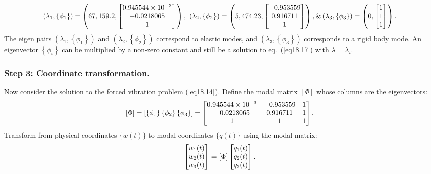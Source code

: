 \documentclass{AeroStructure-ERJohnson}
\begin{document}
\begin{align}\label{eq18.21}
\left(\lambda_{1},\left\{\phi_{1}\right\}\right)=\left(67,159.2,\left[\begin{array}{@{}c@{}}0.945544 \times 10^{-3} \\-0.0218065 \\1\end{array}\right]\right),\ \left(\lambda_{2},\left\{\phi_{2}\right\}\right)=\left(5,474.23,\left[\begin{array}{@{}c@{}}-0.953559 \\0.916711 \\1\end{array}\right]\right), \& \left(\lambda_{3},\left\{\phi_{3}\right\}\right)=\left(0,\left[\begin{array}{@{}l@{}}1 \\1 \\1\end{array}\right]\right).
\end{align}
The eigen pairs $\left(\lambda_{1},\left\{\phi_{1}\right\}\right)$ and $\left(\lambda_{2},\left\{\phi_{2}\right\}\right)$ correspond to elastic modes, and $\left(\lambda_{3},\left\{\phi_{3}\right\}\right)$ corresponds to a rigid body mode. An eigenvector $\left\{\phi_{i}\right\}$ can be multiplied by a non-zero constant and still be a solution to eq.~(\ref{eq18.17}) with $\lambda=\lambda_{i}$.

\subsubsection{Step 3: Coordinate transformation.} Now consider the solution to the forced vibration problem (\ref{eq18.14}). Define the modal matrix $[\Phi]$ whose columns are the eigenvectors:
\begin{align}\label{eq18.22}
[\Phi]=\left[\left\{\phi_{1}\right\}\left\{\phi_{2}\right\}\left\{\phi_{3}\right\}\right]=\left[\begin{array}{@{}ccc@{}}0.945544 \times 10^{-3} & -0.953559 & 1 \\-0.0218065 & 0.916711 & 1 \\1 & 1 & 1\end{array}\right].
\end{align}
Transform from physical coordinates $\{w(t)\}$ to modal coordinates $\{q(t)\}$ using the modal matrix:
\begin{align}\label{eq18.23}
\left[\begin{array}{@{}l@{}}w_{1}(t) \\w_{2}(t) \\w_{3}(t)\end{array}\right]=[\Phi]\left[\begin{array}{@{}l@{}}q_{1}(t) \\q_{2}(t) \\q_{3}(t)\end{array}\right].
\end{align}
\end{document}
